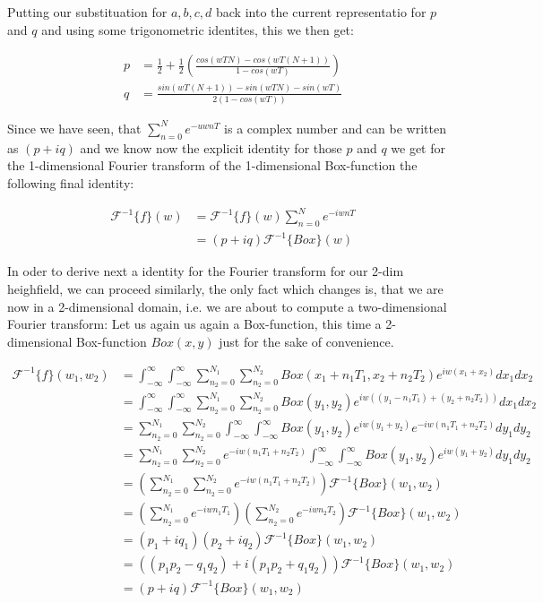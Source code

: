 Putting our substituation for $a, b, c, d$ back into the current representatio for $p$ and $q$ and using some trigonometric identites, this we then get:

\begin{align}
p& =\frac{1}{2}+\frac{1}{2}\left(\frac{cos(wTN)-cos(wT(N+1))}{1-cos(wT)}\right)\\
q& =\frac{sin(wT(N+1))-sin(wTN)-sin(wT)}{2(1-cos(wT))}
\end{align}

Since we have seen, that $\sum_{n=0}^N e^{-uwnT}$ is a complex number and can be written as $(p+iq)$ and we know now the explicit identity for those $p$ and $q$ we get for the 1-dimensional Fourier transform of the 1-dimensional Box-function the following final identity:

\begin{align*}
\mathcal{F}^{-1}\{f\}(w)
& =\mathcal{F}^{-1}\{f\}(w) \sum_{n=0}^{N} e^{-iwnT} \\
& = (p+iq) \mathcal{F}^{-1}\{Box\}(w)  
\end{align*}

In oder to derive next a identity for the Fourier transform for our 2-dim heighfield, we can proceed similarly, the only fact which changes is, that we are now in a 2-dimensional domain, i.e. we are about to compute a two-dimensional Fourier transform:
Let us again us again a Box-function, this time a 2-dimensional Box-function $Box(x,y)$ just for the sake of convenience.

\begin{align*}
\mathcal{F}^{-1}\{f\}(w_1,w_2)
& = \int_{-\infty}^{\infty}\int_{-\infty}^{\infty} \sum_{n_2=0}^{N_1} \sum_{n_2=0}^{N_2} Box(x_1 + n_1 T_1, x_2 + n_2 T_2) e^{iw(x_1 + x_2)}dx_1 dx_2 \\
& = \int_{-\infty}^{\infty}\int_{-\infty}^{\infty} \sum_{n_2=0}^{N_1} \sum_{n_2=0}^{N_2} Box(y_1, y_2) e^{iw((y_1 - n_1 T_1) + (y_2 + n_2 T_2))}dx_1 dx_2 \\
& =\sum_{n_2=0}^{N_1} \sum_{n_2=0}^{N_2} \int_{-\infty}^{\infty}\int_{-\infty}^{\infty} Box(y_1, y_2) e^{iw(y_1 + y_2)} e^{-iw(n_1 T_1 + n_2 T_2)}dy_1 dy_2 \\
& =\sum_{n_2=0}^{N_1} \sum_{n_2=0}^{N_2} e^{-iw(n_1 T_1 + n_2 T_2)} \int_{-\infty}^{\infty}\int_{-\infty}^{\infty} Box(y_1, y_2) e^{iw(y_1 + y_2)} dy_1 dy_2 \\
& =\left(\sum_{n_2=0}^{N_1} \sum_{n_2=0}^{N_2} e^{-iw(n_1 T_1 + n_2 T_2)}\right) \mathcal{F}^{-1}\{Box\}(w_1,w_2) \\
& =\left(\sum_{n_2=0}^{N_1} e^{-iw n_1 T_1}\right) \left(\sum_{n_2=0}^{N_2} e^{-iw n_2 T_2}\right) \mathcal{F}^{-1}\{Box\}(w_1,w_2) \\
& =(p_1 + i q_1)(p_2 + i q_2) \mathcal{F}^{-1}\{Box\}(w_1,w_2) \\
& =((p_1 p_2 - q_1 q_2) + i(p_1 p_2 + q_1 q_2)) \mathcal{F}^{-1}\{Box\}(w_1,w_2) \\
& =(p + iq) \mathcal{F}^{-1}\{Box\}(w_1,w_2)
\end{align*}

